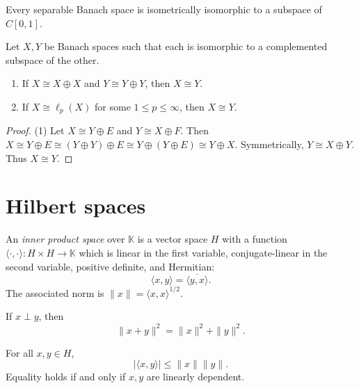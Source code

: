 \begin{theorem}
\label{theorem-banach-mazur}
Every separable Banach space is isometrically
isomorphic to a subspace of $C[0,1]$.
\end{theorem}

\begin{theorem}
\label{theorem-pelczynski-decomposition}
Let $X, Y$ be Banach spaces such that each is
isomorphic to a complemented subspace of the
other.
\begin{enumerate}
\item If $X \cong X \oplus X$ and $Y \cong Y
\oplus Y$, then $X \cong Y$.
\item If $X \cong \ell_p(X)$ for some $1 \leq
p \leq \infty$, then $X \cong Y$.
\end{enumerate}
\end{theorem}

\begin{proof}
(1) Let $X \cong Y \oplus E$ and $Y \cong X
\oplus F$. Then $X \cong Y \oplus E \cong (Y
\oplus Y) \oplus E \cong Y \oplus (Y \oplus
E) \cong Y \oplus X$. Symmetrically, $Y \cong
X \oplus Y$. Thus $X \cong Y$.
\end{proof}


\section{Hilbert spaces}
\label{section-hilbert-spaces}

\begin{definition}
\label{definition-inner-product-space}
An {\it inner product space} over
$\mathbb{K}$ is a vector space $H$ with a
function $\langle\cdot,\cdot\rangle:H\times
H\to\mathbb{K}$ which is linear in the first
variable, conjugate-linear in the second
variable, positive definite, and Hermitian:
$$
\langle x,y\rangle=\overline{\langle
y,x\rangle}.
$$
The associated norm is $\|x\|=\langle
x,x\rangle^{1/2}$.
\end{definition}

\begin{proposition}[Pythagoras]
\label{proposition-pythagoras}
If $x\perp y$, then
$$
\|x+y\|^2=\|x\|^2+\|y\|^2.
$$
\end{proposition}

\begin{theorem}
\label{theorem-cauchy-schwarz}
For all $x,y\in H$,
$$
|\langle x,y\rangle|\leq \|x\|\|y\|.
$$
Equality holds if and only if $x,y$ are
linearly dependent.
\end{theorem}

